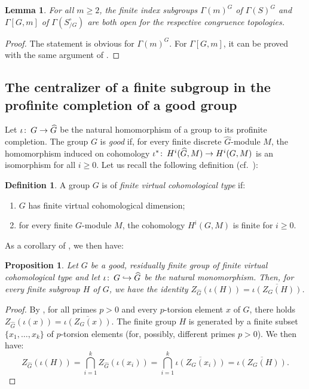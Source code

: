 \documentclass[12pt,twoside]{amsart}
\newtheorem{proposition}[theorem]{Proposition}
\newtheorem{lemma}[theorem]{Lemma}
\theoremstyle{definition}
\newtheorem{definition}[theorem]{Definition}
\def\G{{\Gamma}}
\def\ol{\overline}
\def\wh{\widehat}
\def\hookra{\hookrightarrow}
\def\co{\colon\thinspace}
\begin{document}
\begin{lemma}\label{congsub}For all $m\geq 2$, the finite index subgroups $\G(m)^G$ of $\G(S)^G$ and $\G[G,m]$ of $\G(S_{/G}^\circ)$
are both open for the respective congruence topologies.
\end{lemma}

\begin{proof}The statement is obvious for $\G(m)^G$. For $\G[G,m]$,
it can be proved with the same argument of \cite[Corollary~2.3]{sym}. 
\end{proof}


\subsection{The centralizer of a finite subgroup in the profinite completion of a good group}
Let $\iota\co G\to\wh{G}$ be the natural homomorphism of a group to its profinite completion. The group $G$ is \emph{good}
if, for every finite discrete $\wh{G}$-module $M$, the homomorphism induced on cohomology $\iota^\ast\co H^i(\wh{G},M)\to H^i(G,M)$ 
is an isomorphism for all $i\geq 0$. Let us recall the following definition (cf.\ \cite[Definition~1.2]{BZ}):

\begin{definition}\label{fct}A group $G$ is of \emph{finite virtual cohomological type} if:
\begin{enumerate}
\item $G$ has finite virtual cohomological dimension;
\item for every finite $G$-module $M$, the cohomology $H^i(G,M)$ is finite for $i\geq 0$.
\end{enumerate}
\end{definition}

As a corollary of \cite[Theorem~A]{BZ}, we then have:

\begin{proposition}\label{centgood}Let $G$ be a good, residually finite group of finite virtual cohomological type 
and let $\iota\co G\hookra\wh{G}$ be the natural monomorphism. Then, for every finite subgroup $H$ of $G$, 
we have the identity $Z_{\wh{G}}(\iota(H))=\ol{\iota(Z_G(H))}$.
\end{proposition}

\begin{proof}By \cite[(iii) of Theorem~A]{BZ}, for all primes $p>0$ and every $p$-torsion element $x$ of $G$, there holds 
$Z_{\wh{G}}(\iota(x))=\ol{\iota(Z_G(x))}$. The finite group $H$ is generated by a finite subset $\{x_1,\dots,x_k\}$ of $p$-torsion elements 
(for, possibly, different primes $p>0$). We then have:
\[Z_{\wh{G}}(\iota(H))=\bigcap_{i=1}^kZ_{\wh{G}}(\iota(x_i))=\bigcap_{i=1}^k\ol{\iota(Z_G(x_i))}=\ol{\iota(Z_G(H))}.\]
\end{proof}
\end{document}
